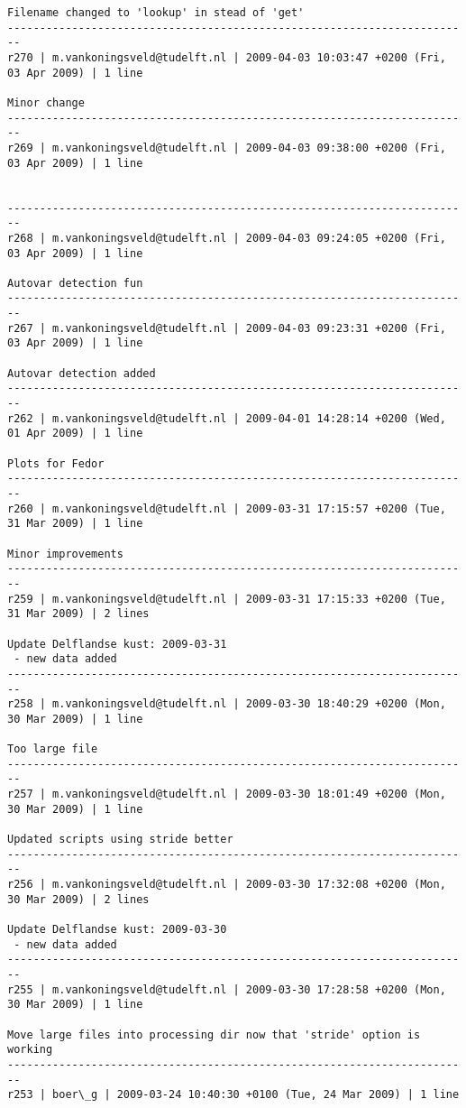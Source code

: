 \documentclass[9]{report}
\begin{document}
\begin{description}
\begin{verbatim}
Filename changed to 'lookup' in stead of 'get'
------------------------------------------------------------------------
r270 | m.vankoningsveld@tudelft.nl | 2009-04-03 10:03:47 +0200 (Fri, 03 Apr 2009) | 1 line

Minor change
------------------------------------------------------------------------
r269 | m.vankoningsveld@tudelft.nl | 2009-04-03 09:38:00 +0200 (Fri, 03 Apr 2009) | 1 line


------------------------------------------------------------------------
r268 | m.vankoningsveld@tudelft.nl | 2009-04-03 09:24:05 +0200 (Fri, 03 Apr 2009) | 1 line

Autovar detection fun
------------------------------------------------------------------------
r267 | m.vankoningsveld@tudelft.nl | 2009-04-03 09:23:31 +0200 (Fri, 03 Apr 2009) | 1 line

Autovar detection added
------------------------------------------------------------------------
r262 | m.vankoningsveld@tudelft.nl | 2009-04-01 14:28:14 +0200 (Wed, 01 Apr 2009) | 1 line

Plots for Fedor
------------------------------------------------------------------------
r260 | m.vankoningsveld@tudelft.nl | 2009-03-31 17:15:57 +0200 (Tue, 31 Mar 2009) | 1 line

Minor improvements
------------------------------------------------------------------------
r259 | m.vankoningsveld@tudelft.nl | 2009-03-31 17:15:33 +0200 (Tue, 31 Mar 2009) | 2 lines

Update Delflandse kust: 2009-03-31
 - new data added
------------------------------------------------------------------------
r258 | m.vankoningsveld@tudelft.nl | 2009-03-30 18:40:29 +0200 (Mon, 30 Mar 2009) | 1 line

Too large file
------------------------------------------------------------------------
r257 | m.vankoningsveld@tudelft.nl | 2009-03-30 18:01:49 +0200 (Mon, 30 Mar 2009) | 1 line

Updated scripts using stride better
------------------------------------------------------------------------
r256 | m.vankoningsveld@tudelft.nl | 2009-03-30 17:32:08 +0200 (Mon, 30 Mar 2009) | 2 lines

Update Delflandse kust: 2009-03-30
 - new data added
------------------------------------------------------------------------
r255 | m.vankoningsveld@tudelft.nl | 2009-03-30 17:28:58 +0200 (Mon, 30 Mar 2009) | 1 line

Move large files into processing dir now that 'stride' option is working
------------------------------------------------------------------------
r253 | boer\_g | 2009-03-24 10:40:30 +0100 (Tue, 24 Mar 2009) | 1 line


\end{verbatim}
\end{description}
\end{document}
